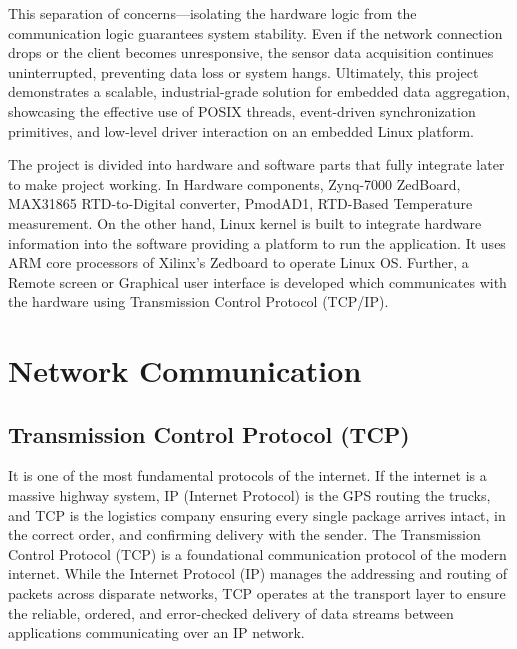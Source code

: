 This separation of concerns—isolating the hardware logic from the
communication logic guarantees system stability. Even if the network
connection drops or the client becomes unresponsive, the sensor data
acquisition continues uninterrupted, preventing data loss or system hangs.
Ultimately, this project demonstrates a scalable, industrial-grade solution
for embedded data aggregation, showcasing the effective use of POSIX threads,
event-driven synchronization primitives, and low-level driver interaction on
an embedded Linux platform.

The project is divided into hardware and software parts that fully integrate
later to make project working. In Hardware components, Zynq-7000 ZedBoard,
MAX31865 RTD-to-Digital converter, PmodAD1, RTD-Based Temperature measurement.
On the other hand, Linux kernel is built to integrate hardware information into
the software providing a platform to run the application. It uses ARM core
processors of Xilinx's Zedboard to operate Linux OS. Further, a Remote screen
or Graphical user interface is developed which communicates with the hardware
using Transmission Control Protocol (TCP/IP).


%


\section{Network Communication}
\subsection{Transmission Control Protocol (TCP)}
It is one of the most fundamental protocols of the internet. If the internet is a massive highway system, IP (Internet Protocol) is the GPS routing the trucks, and TCP is the logistics company ensuring every single package arrives intact, in the correct order, and confirming delivery with the sender.
The Transmission Control Protocol (TCP) is a foundational communication protocol of the modern internet. While the Internet Protocol (IP) manages the addressing and routing of packets across disparate networks, TCP operates at the transport layer to ensure the reliable, ordered, and error-checked delivery of data streams between applications communicating over an IP network.

